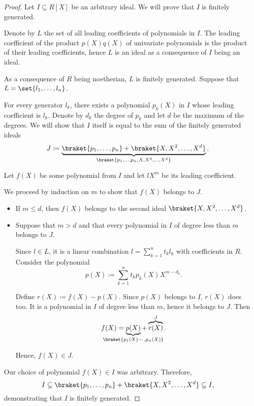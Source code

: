 \begin{proof}
  Let \( I \subseteq R[X] \) be an arbitrary ideal. We will prove that \( I \) is finitely generated.

  Denote by \( L \) the set of all leading coefficients of polynomials in \( I \). The leading coefficient of the product \( p(X) q(X) \) of univariate polynomials is the product of their leading coefficients, hence \( L \) is an ideal as a consequence of \( I \) being an ideal.

  As a consequence of \( R \) being noetherian, \( L \) is finitely generated. Suppose that \( L = \set{ l_1, \ldots, l_n } \).

  For every generator \( l_k \), there exists a polynomial \( p_k(X) \) in \( I \) whose leading coefficient is \( l_k \). Denote by \( d_k \) the degree of \( p_k \) and let \( d \) be the maximum of the degrees. We will show that \( I \) itself is equal to the sum of the finitely generated ideals
  \begin{equation*}
    J \coloneqq \underbrace{ \braket{ p_1, \ldots, p_n } + \braket{ X, X^2, \ldots, X^d } }_{ \braket{ p_1, \ldots, p_n, X, X^2, \ldots, X^d } }.
  \end{equation*}

  Let \( f(X) \) be some polynomial from \( I \) and let \( l X^m \) be its leading coefficient.

  We proceed by induction on \( m \) to show that \( f(X) \) belongs to \( J \).
  \begin{itemize}
    \item If \( m \leq d \), then \( f(X) \) belongs to the second ideal \( \braket{ X, X^2, \ldots, X^d } \).

    \item Suppose that \( m > d \) and that every polynomial in \( I \) of degree less than \( m \) belongs to \( J \).

    Since \( l \in L \), it is a linear combination \( l = \sum_{k=1}^n t_k l_k \) with coefficients in \( R \). Consider the polynomial
    \begin{equation*}
      p(X) \coloneqq \sum_{k=1}^n t_k p_k(X) X^{m - d_k}.
    \end{equation*}

    Define \( r(X) \coloneqq f(X) - p(X) \). Since \( p(X) \) belongs to \( I \), \( r(X) \) does too. It is a polynomial in \( I \) of degree less than \( m \), hence it belongs to \( J \). Then
    \begin{equation*}
      f(X) = \underbrace{ p(X) }_{\mathclap{\braket{ p_1(X) \cdots, p_n(X) }}} + \overbrace{ r(X) }^J.
    \end{equation*}

    Hence, \( f(X) \in J \).
  \end{itemize}

  Our choice of polynomial \( f(X) \in I \) was arbitrary. Therefore,
  \begin{equation*}
    I \subseteq \braket{ p_1, \ldots, p_n } + \braket{ X, X^2, \ldots, X^d } \subseteq I,
  \end{equation*}
  demonstrating that \( I \) is finitely generated.
\end{proof}

